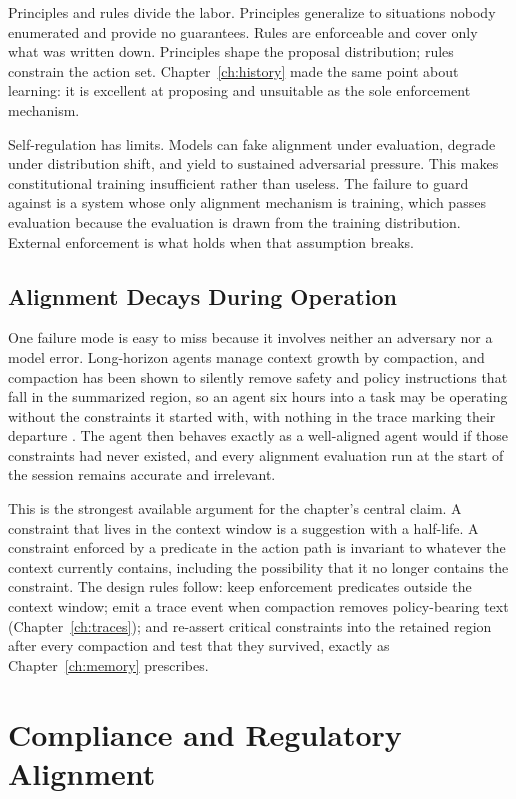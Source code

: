 \documentclass[11pt]{book}
\begin{document}
Principles and rules divide the labor. Principles generalize to situations nobody enumerated and provide no guarantees. Rules are enforceable and cover only what was written down. Principles shape the proposal distribution; rules constrain the action set. Chapter~\ref{ch:history} made the same point about learning: it is excellent at proposing and unsuitable as the sole enforcement mechanism.

Self-regulation has limits. Models can fake alignment under evaluation, degrade under distribution shift, and yield to sustained adversarial pressure. This makes constitutional training insufficient rather than useless. The failure to guard against is a system whose only alignment mechanism is training, which passes evaluation because the evaluation is drawn from the training distribution. External enforcement is what holds when that assumption breaks.

\subsection{Alignment Decays During Operation}

One failure mode is easy to miss because it involves neither an adversary nor a model error. Long-horizon agents manage context growth by compaction, and compaction has been shown to silently remove safety and policy instructions that fall in the summarized region, so an agent six hours into a task may be operating without the constraints it started with, with nothing in the trace marking their departure \cite{govdecay2026}. The agent then behaves exactly as a well-aligned agent would if those constraints had never existed, and every alignment evaluation run at the start of the session remains accurate and irrelevant.

This is the strongest available argument for the chapter's central claim. A constraint that lives in the context window is a suggestion with a half-life. A constraint enforced by a predicate in the action path is invariant to whatever the context currently contains, including the possibility that it no longer contains the constraint. The design rules follow: keep enforcement predicates outside the context window; emit a trace event when compaction removes policy-bearing text (Chapter~\ref{ch:traces}); and re-assert critical constraints into the retained region after every compaction and test that they survived, exactly as Chapter~\ref{ch:memory} prescribes.

\section{Compliance and Regulatory Alignment}
\end{document}
